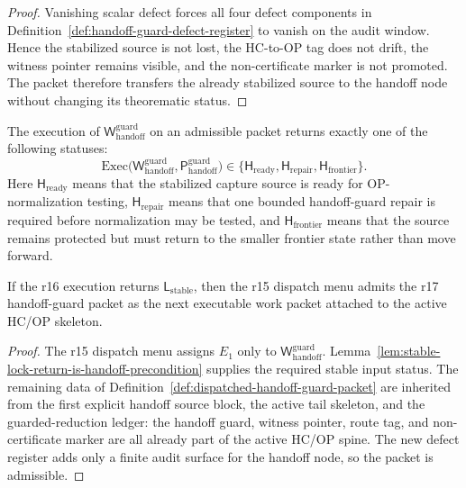 \begin{proof}
Vanishing scalar defect forces all four defect components in Definition~\ref{def:handoff-guard-defect-register} to vanish on the audit window.  Hence the stabilized source is not lost, the HC-to-OP tag does not drift, the witness pointer remains visible, and the non-certificate marker is not promoted.  The packet therefore transfers the already stabilized source to the handoff node without changing its theorematic status.
\end{proof}

\begin{definition}
\label{def:r17-handoff-guard-return}
The execution of \(\mathsf W_{\mathrm{handoff}}^{\mathrm{guard}}\) on an admissible packet returns exactly one of the following statuses:
\[
\mathrm{Exec}\bigl(\mathsf W_{\mathrm{handoff}}^{\mathrm{guard}},
                   \mathsf P_{\mathrm{handoff}}^{\mathrm{guard}}\bigr)
\in
\{\mathsf H_{\mathrm{ready}},\mathsf H_{\mathrm{repair}},\mathsf H_{\mathrm{frontier}}\}.
\]
Here \(\mathsf H_{\mathrm{ready}}\) means that the stabilized capture source is ready for OP-normalization testing, \(\mathsf H_{\mathrm{repair}}\) means that one bounded handoff-guard repair is required before normalization may be tested, and \(\mathsf H_{\mathrm{frontier}}\) means that the source remains protected but must return to the smaller frontier state rather than move forward.
\end{definition}

\begin{proposition}
\label{prop:first-dispatched-handoff-guard-packet-admissible}
If the r16 execution returns \(\mathsf L_{\mathrm{stable}}\), then the r15 dispatch menu admits the r17 handoff-guard packet as the next executable work packet attached to the active HC/OP skeleton.
\end{proposition}

\begin{proof}
The r15 dispatch menu assigns \(E_1\) only to \(\mathsf W_{\mathrm{handoff}}^{\mathrm{guard}}\).  Lemma~\ref{lem:stable-lock-return-is-handoff-precondition} supplies the required stable input status.  The remaining data of Definition~\ref{def:dispatched-handoff-guard-packet} are inherited from the first explicit handoff source block, the active tail skeleton, and the guarded-reduction ledger: the handoff guard, witness pointer, route tag, and non-certificate marker are all already part of the active HC/OP spine.  The new defect register adds only a finite audit surface for the handoff node, so the packet is admissible.
\end{proof}

